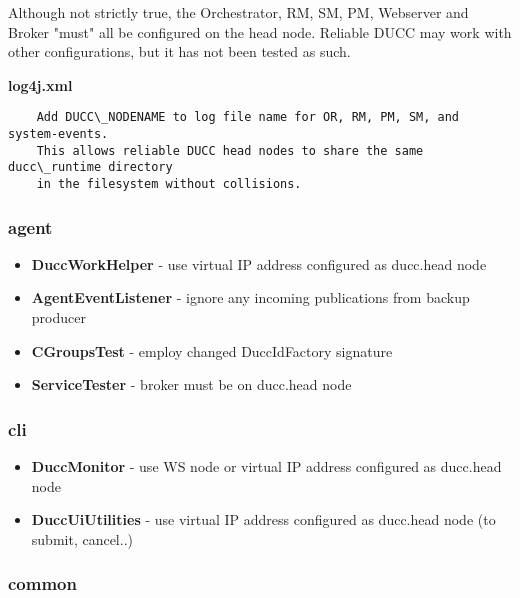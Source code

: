 \documentclass[letterpaper]{article}
\begin{document}
Although not strictly true, the Orchestrator, RM, SM, PM, Webserver and Broker "must"
all be configured on the head node.  Reliable DUCC may work with other configurations,
but it has not been tested as such.

\textbf{log4j.xml}

   \begin{verbatim}
    Add DUCC\_NODENAME to log file name for OR, RM, PM, SM, and system-events.
    This allows reliable DUCC head nodes to share the same ducc\_runtime directory
    in the filesystem without collisions.
   \end{verbatim}

\subsubsection{agent}

{\renewcommand\labelitemi{}
\begin{itemize}
  \item \textbf{DuccWorkHelper} - use virtual IP address configured as ducc.head node
  \item \textbf{AgentEventListener} - ignore any incoming publications from backup producer
  \item \textbf{CGroupsTest} - employ changed DuccIdFactory signature
  \item \textbf{ServiceTester} - broker must be on ducc.head node
\end{itemize}
}

\subsubsection{cli}

{\renewcommand\labelitemi{}
\begin{itemize}
  \item \textbf{DuccMonitor} - use WS node or virtual IP address configured as ducc.head node
  \item \textbf{DuccUiUtilities} - use virtual IP address configured as ducc.head node (to submit, cancel..)
\end{itemize}
}

\subsubsection{common}
\end{document}
